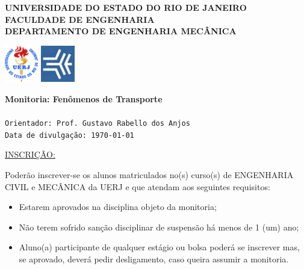 \documentclass[a4paper,portuguese,12pt]{article}
\begin{document}
\thispagestyle{empty}

\begin{minipage}{0.72\linewidth}
	\normalsize\textbf{UNIVERSIDADE DO ESTADO DO RIO DE JANEIRO\\
	              FACULDADE DE ENGENHARIA\\
				  DEPARTAMENTO DE ENGENHARIA MECÂNICA}
\end{minipage}
\begin{minipage}{0.27\linewidth}
	\flushright
	\includegraphics[height=16mm]{figs/logouerj.jpg}
	\hspace{.5cm}
	\includegraphics[height=16mm]{figs/fen.png}
\end{minipage}

\hrulefill

\Large \color{NavyBlue} \textbf{Monitoria: Fenômenos de Transporte}\\
\color{Black}\\ 
\normalsize \texttt{Orientador: Prof. Gustavo Rabello dos Anjos}\\
\normalsize \texttt{Data de divulgação: \today}

\vspace{1cm}

\underline{INSCRIÇÃO:}

Poderão inscrever-se os alunos matriculados no(s) curso(s) de ENGENHARIA
CIVIL e MECÂNICA da UERJ e que atendam aos seguintes requisitos:

\begin{itemize}
	\item Estarem aprovados na disciplina objeto da monitoria;
	\item Não terem sofrido sanção disciplinar de suspensão há menos de
	1 (um) ano;
	\item Aluno(a) participante de qualquer estágio ou bolsa poderá se
	inscrever mas, se aprovado, deverá pedir desligamento, caso queira
	assumir a monitoria.
\end{itemize}

\vspace{1cm}
\end{document}
